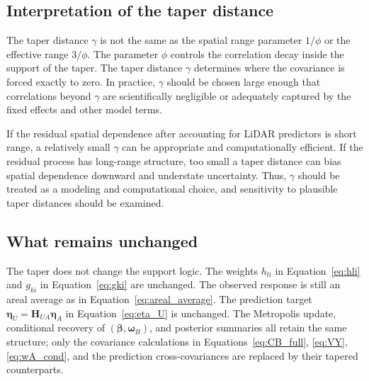 \documentclass[11pt]{article}
\newcommand{\bsb}{\bm{\beta}}
\newcommand{\bsw}{\bm{\omega}}
\begin{document}
\subsection{Interpretation of the taper distance}

The taper distance $\gamma$ is not the same as the spatial range parameter $1/\phi$ or the effective range $3/\phi$. The parameter $\phi$ controls the correlation decay inside the support of the taper. The taper distance $\gamma$ determines where the covariance is forced exactly to zero. In practice, $\gamma$ should be chosen large enough that correlations beyond $\gamma$ are scientifically negligible or adequately captured by the fixed effects and other model terms.

If the residual spatial dependence after accounting for LiDAR predictors is short range, a relatively small $\gamma$ can be appropriate and computationally efficient. If the residual process has long-range structure, too small a taper distance can bias spatial dependence downward and understate uncertainty. Thus, $\gamma$ should be treated as a modeling and computational choice, and sensitivity to plausible taper distances should be examined.

\subsection{What remains unchanged}

The taper does not change the support logic. The weights $h_{li}$ in Equation~\eqref{eq:hli} and $g_{ki}$ in Equation~\eqref{eq:gki} are unchanged. The observed response is still an areal average as in Equation~\eqref{eq:areal_average}. The prediction target $\bm{\eta}_U=\bm{H}_{UA}\bm{\eta}_A$ in Equation~\eqref{eq:eta_U} is unchanged. The Metropolis update, conditional recovery of $(\bsb,\bsw_B)$, and posterior summaries all retain the same structure; only the covariance calculations in Equations~\eqref{eq:CB_full}, \eqref{eq:VY}, \eqref{eq:wA_cond}, and the prediction cross-covariances are replaced by their tapered counterparts.
\end{document}

